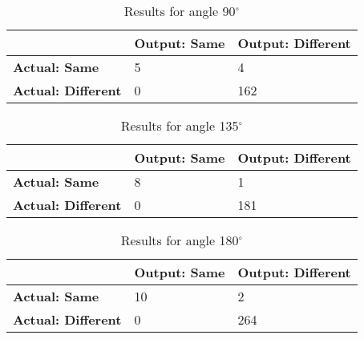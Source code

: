 \begin{table}[H]
    \centering
	\begin{spacing}{1.5}    
    \begin{tabular}{|l|l|l|}
        \hline
        \cellcolor{gray} & \textbf{Output: Same} & \textbf{Output: Different} \\ [0.5ex]
        \hline\hline
        \textbf{Actual: Same} & 5 & 4 \\ [0.5ex]
        \hline
        \textbf{Actual: Different} & 0 & 162 \\ [0.5ex]
        \hline
    \end{tabular}
    \end{spacing}
    \caption{Results for angle 90$^{\circ}$}
\end{table}
            
\begin{table}[H]
    \centering
	\begin{spacing}{1.5}    
    \begin{tabular}{|l|l|l|}
        \hline
        \cellcolor{gray} & \textbf{Output: Same} & \textbf{Output: Different} \\ [0.5ex]
        \hline\hline
        \textbf{Actual: Same} & 8 & 1 \\ [0.5ex]
        \hline
        \textbf{Actual: Different} & 0 & 181 \\ [0.5ex]
        \hline
    \end{tabular}
    \end{spacing}
    \caption{Results for angle 135$^{\circ}$}
\end{table}
            
\begin{table}[H]
    \centering
	\begin{spacing}{1.5}    
    \begin{tabular}{|l|l|l|}
        \hline
        \cellcolor{gray} & \textbf{Output: Same} & \textbf{Output: Different} \\ [0.5ex]
        \hline\hline
        \textbf{Actual: Same} & 10 & 2 \\ [0.5ex]
        \hline
        \textbf{Actual: Different} & 0 & 264 \\ [0.5ex]
        \hline
    \end{tabular}
    \end{spacing}
    \caption{Results for angle 180$^{\circ}$}
\end{table}
            
